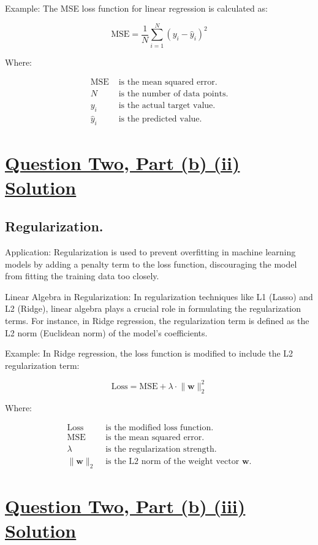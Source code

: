\documentclass{article}
\begin{document}
Example: The MSE loss function for linear regression is calculated as:

\[
\text{MSE} = \frac{1}{N} \sum_{i=1}^{N} (y_i - \hat{y}_i)^2
\]

Where:

\begin{align*}
\text{MSE} & \text{ is the mean squared error.} \\
N & \text{ is the number of data points.} \\
y_i & \text{ is the actual target value.} \\
\hat{y}_i & \text{ is the predicted value.}
\end{align*}

\section*{\uline{\large Question Two, Part (b) (ii) Solution}}

\subsection*{Regularization.}
Application: Regularization is used to prevent overfitting in machine learning models by adding a penalty term to the loss function, discouraging the model from fitting the training data too closely.

Linear Algebra in Regularization: In regularization techniques like L1 (Lasso) and L2 (Ridge), linear algebra plays a crucial role in formulating the regularization terms. For instance, in Ridge regression, the regularization term is defined as the L2 norm (Euclidean norm) of the model's coefficients.

Example: In Ridge regression, the loss function is modified to include the L2 regularization term:

\[
\text{Loss} = \text{MSE} + \lambda \cdot \lVert \mathbf{w} \rVert_2^2
\]

Where:

\begin{align*}
\text{Loss} & \text{ is the modified loss function.} \\
\text{MSE} & \text{ is the mean squared error.} \\
\lambda & \text{ is the regularization strength.} \\
\lVert \mathbf{w} \rVert_2 & \text{ is the L2 norm of the weight vector } \mathbf{w}.
\end{align*}

\section*{\uline{\large Question Two, Part (b) (iii) Solution}}
\end{document}

